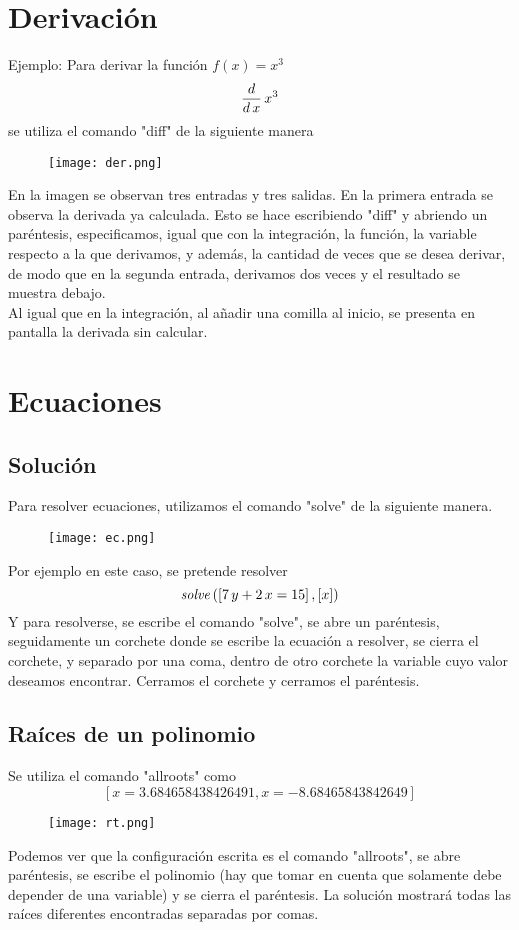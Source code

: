 \documentclass{article}
\begin{document}
\section{Derivación}
Ejemplo: Para derivar la función $f(x)=x^{3}$
$${{d}\over{d\,x}}\,x^3$$
se utiliza el comando "diff" de la siguiente manera
\begin{figure}[H]
\texttt{[image: der.png]}
\end{figure}
En la imagen se observan tres entradas y tres salidas. En la primera entrada se observa la derivada ya calculada. Esto se hace escribiendo "diff" y abriendo un paréntesis, especificamos, igual que con la integración, la función, la variable respecto a la que derivamos, y además, la cantidad de veces que se desea derivar, de modo que en la segunda entrada, derivamos dos veces y el resultado se muestra debajo. 
\\Al igual que en la integración, al añadir una comilla al inicio, se presenta en pantalla la derivada sin calcular. 
\section{Ecuaciones}
\subsection{Solución}
Para resolver ecuaciones, utilizamos el comando "solve" de la siguiente manera. 
\begin{figure}[H]
\texttt{[image: ec.png]}
\end{figure}
Por ejemplo en este caso, se pretende resolver $${\it solve}\left(\left[ 7\,y+2\,x=15 \right]  , \left[ x \right] 
 \right)$$
Y para resolverse, se escribe el comando "solve", se abre un paréntesis, seguidamente un corchete donde se escribe la ecuación a resolver, se cierra el corchete, y separado por una coma, dentro de otro corchete la variable cuyo valor deseamos encontrar. Cerramos el corchete y cerramos el paréntesis.
\subsection{Raíces de un polinomio}
Se utiliza el comando "allroots" como $$\left[ x=3.684658438426491 , x=-8.68465843842649 \right] $$
\begin{figure}[H]
\texttt{[image: rt.png]}
\end{figure}
Podemos ver que la configuración escrita es el comando "allroots", se abre paréntesis, se escribe el polinomio (hay que tomar en cuenta que solamente debe depender de una variable) y se cierra el paréntesis. La solución mostrará todas las raíces diferentes encontradas separadas por comas.
\end{document}
